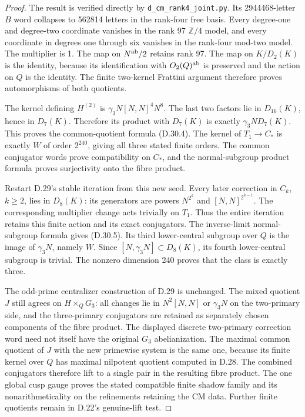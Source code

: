 \begin{proof}
The result is verified directly by
\texttt{d\_cm\_rank4\_joint.py}. Its 2944468-letter
$B$ word collapses to 562814 letters in the rank-four
free basis. Every degree-one and degree-two coordinate
vanishes in the rank 97 $\mathbb Z/4$ model, and every
coordinate in degrees one through six vanishes in
the rank-four mod-two model. The multiplier is 1.
The map on $N^{\rm ab}/2$ retains rank 97. The map on
$K/D_2(K)$ is the identity, because its identification
with $O_2(Q)^{\rm ab}$ is preserved and the action on
$Q$ is the identity. The finite two-kernel Frattini
argument therefore proves automorphisms of both quotients.

The kernel defining $H^{(2)}$ is
$\gamma_3N[N,N]^4N^8$. The last two factors lie in
$D_{16}(K)$, hence in $D_7(K)$. Therefore its product
with $D_7(K)$ is exactly $\gamma_3N D_7(K)$.
This proves the common-quotient formula (D.30.4).
The kernel of $T_1\to C_*$ is exactly $W$ of order
$2^{240}$, giving all three stated finite orders.
The common conjugator words prove compatibility on
$C_*$, and the normal-subgroup product formula proves
surjectivity onto the fibre product.

Restart D.29's stable iteration from this new seed.
Every later correction in $C_k$, $k\geq2$, lies in
$D_8(K)$: its generators are powers $N^{2^k}$ and
$[N,N]^{2^{k-1}}$. The corresponding multiplier
change acts trivially on $T_1$. Thus the entire
iteration retains this finite action and its exact
conjugators. The inverse-limit normal-subgroup
formula gives (D.30.5). Its third lower-central
subgroup over $Q$ is the image of $\gamma_3N$,
namely $W$. Since $[N,\gamma_3N]\subset D_8(K)$,
its fourth lower-central subgroup is trivial.
The nonzero dimension 240 proves that the class is
exactly three.

The odd-prime centralizer construction of D.29 is
unchanged. The mixed quotient $J$ still agrees on
$H\times_QG_3$: all changes lie in $N^2[N,N]$ or
$\gamma_3N$ on the two-primary side, and the
three-primary conjugators are retained as separately
chosen components of the fibre product. The displayed
discrete two-primary correction word need not itself
have the original $G_3$ abelianization. The maximal
common quotient of $J$ with the new primewise system is
the same one, because its finite kernel over $Q$
has maximal nilpotent quotient computed in D.28.
The combined conjugators therefore lift to a single
pair in the resulting fibre product. The one global
cusp gauge proves the stated compatible finite
shadow family and its nonarithmeticality on the
refinements retaining the CM data. Further finite
quotients remain in D.22's genuine-lift test.
\end{proof}
